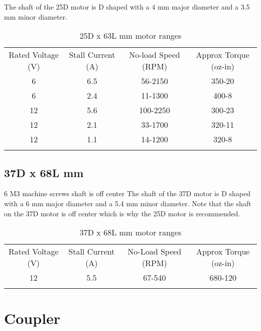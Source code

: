 \documentclass[12pt, onecolumn]{article}
\begin{document}
The shaft of the 25D motor is D shaped with a 4 mm major diameter and a 3.5 mm minor diameter.

\begin{table}[h!]
    \centering
    \begin{tabular}{cccc}
        \hline\\
        \hline
        Rated Voltage (V) & Stall Current (A) & No-load Speed (RPM) & Approx Torque (oz-in)\\
        \hline
        6 & 6.5 & 56-2150 & 350-20\\
        6 & 2.4 & 11-1300 & 400-8\\
        12 & 5.6 & 100-2250 & 300-23\\
        12 & 2.1 & 33-1700 & 320-11\\
        12 & 1.1 & 14-1200 & 320-8\\
        \hline\\
        \hline
    \end{tabular}
    \caption{25D x 63L mm motor ranges}
    \label{tab:25dx63l}
\end{table}


\subsection{37D x 68L mm}


6 M3 machine screws
shaft is off center
The shaft of the 37D motor is D shaped with a 6 mm major diameter and a 5.4 mm minor diameter. Note that the shaft on the 37D motor is off center which is why the 25D motor is recommended.
\tag{}


\begin{table}[h!]
    \centering

    \begin{tabular}{cccc}
        \hline\\
        \hline 
        Rated Voltage (V) & Stall Current (A) & No-Load Speed (RPM) & Approx Torque (oz-in) \\ \hline
        12 & 5.5 & 67-540 & 680-120 \\
        \hline \\
        \hline
    \end{tabular}
    \caption{37D x 68L mm motor ranges}
    \label{tab:my_label}

\end{table}





\section{Coupler}
\tag{}
\end{document}

